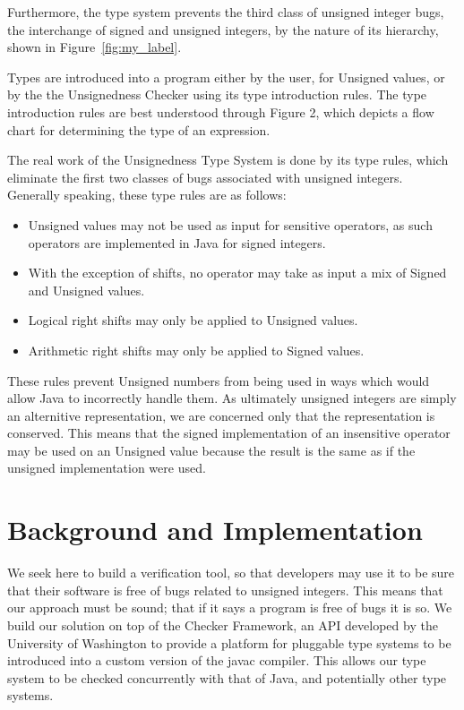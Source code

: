 \documentclass{sig-alternate-05-2015}
\begin{document}
Furthermore, the type system prevents the third class of unsigned integer bugs, the interchange of signed and unsigned integers, by the nature of its hierarchy, shown in Figure~\ref{fig:my_label}.

Types are introduced into a program either by the user, for Unsigned values, or by the the Unsignedness Checker using its type introduction rules. The type introduction rules are best understood through Figure 2, which depicts a flow chart for determining the type of an expression.


The real work of the Unsignedness Type System is done by its type rules, which eliminate the first two classes of bugs associated with unsigned integers. Generally speaking, these type rules are as follows:

\begin{itemize}
  \item Unsigned values may not be used as input for sensitive operators, as such operators are implemented in Java for signed integers.
  \item With the exception of shifts, no operator may take as input a mix of Signed and Unsigned values.
  \item Logical right shifts may only be applied to Unsigned values.
  \item Arithmetic right shifts may only be applied to Signed values.
\end{itemize}

These rules prevent Unsigned numbers from being used in ways which would allow Java to incorrectly handle them. As ultimately unsigned integers are simply an alternitive representation, we are concerned only that the representation is conserved. This means that the signed implementation of an insensitive operator may be used on an Unsigned value because the result is the same as if the unsigned implementation were used.

\section{Background and Implementation}


We seek here to build a verification tool, so that developers may use it to be sure that their software is free of bugs related to unsigned integers. This means that our approach must be sound; that if it says a program is free of bugs it is so. We build our solution on top of the Checker Framework, an API developed by the University of Washington to provide a platform for pluggable type systems to be introduced into a custom version of the javac compiler. This allows our type system to be checked concurrently with that of Java, and potentially other type systems.
\end{document}
